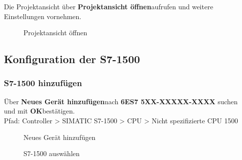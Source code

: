 Die Projektansicht über \glqq\textbf{Projektansicht öffnen}\grqq\:aufrufen und weitere Einstellungen vornehmen.
\begin{figure}[H]
   \centering
   \caption[Projektansicht öffnen]{Projektansicht öffnen}
   \label{fig:Bild2.3}
\end{figure}

\subsection{Konfiguration der S7-1500} \label{sec: Konfiguration_der_S7_1500}

\subsubsection{S7-1500 hinzufügen}
Über \glqq\textbf{Neues Gerät hinzufügen}\grqq\:nach \textbf{6ES7 5XX-XXXXX-XXXX} suchen und mit \glqq\textbf{OK}\grqq\:bestätigen.\\
Pfad: Controller > SIMATIC S7-1500 > CPU > Nicht spezifizierte CPU 1500
\begin{figure}[H]
    \centering
   \begin{minipage}[b]{.4\linewidth}
        \centering
        \caption[Neues Gerät hinzufügen]{Neues Gerät hinzufügen}
        \label{fig:Bild3.1}
   \end{minipage}
   \hspace{.1\linewidth}%
   \begin{minipage}[b]{.4\linewidth}
        \centering
        \caption[S7-1500 auswählen]{S7-1500 auswählen}
        \label{fig:Bild3.2}
   \end{minipage}
\end{figure}

